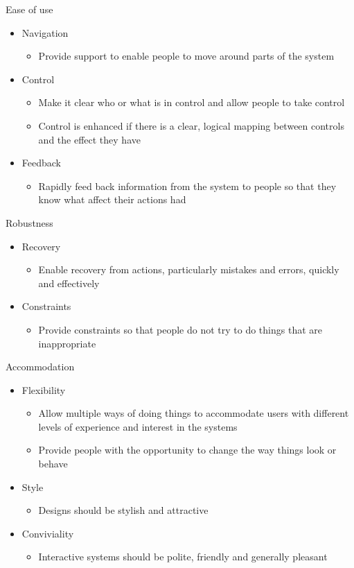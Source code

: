 \documentclass{article}[18pt]
\begin{document}
Ease of use
\begin{itemize}
	\item Navigation
	\begin{itemize}
		\item Provide support to enable people to move around parts of the system
	\end{itemize}
	\item Control
	\begin{itemize}
		\item Make it clear who or what is in control and allow people to take control
		\item Control is enhanced if there is a clear, logical mapping between controls and the effect they have
	\end{itemize}
	\item Feedback
	\begin{itemize}
		\item Rapidly feed back information from the system to people so that they know what affect their actions had
	\end{itemize}
\end{itemize}
Robustness
\begin{itemize}
	\item Recovery
	\begin{itemize}
		\item Enable recovery from actions, particularly mistakes and errors, quickly and effectively
	\end{itemize}
	\item Constraints
	\begin{itemize}
		\item Provide constraints so that people do not try to do things that are inappropriate 
	\end{itemize}
\end{itemize}
Accommodation
\begin{itemize}
	\item Flexibility
	\begin{itemize}
		\item Allow multiple ways of doing things to accommodate users with different levels of experience and interest in the systems
		\item Provide people with the opportunity to change the way things look or behave
	\end{itemize}
	\item Style
	\begin{itemize}
		\item Designs should be stylish and attractive
	\end{itemize}
	\item Conviviality
	\begin{itemize}
		\item Interactive systems should be polite, friendly and generally pleasant
	\end{itemize}
\end{itemize}
\end{document}
